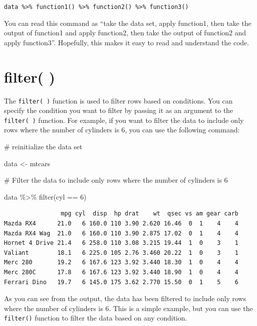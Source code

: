 \documentclass[
  letterpaper,
  DIV=11,
  numbers=noendperiod]{scrreprt}
\newenvironment{Shaded}{\begin{snugshade}}{\end{snugshade}}
\newcommand{\CommentTok}[1]{\textcolor[rgb]{0.37,0.37,0.37}{#1}}
\newcommand{\DecValTok}[1]{\textcolor[rgb]{0.68,0.00,0.00}{#1}}
\newcommand{\FunctionTok}[1]{\textcolor[rgb]{0.28,0.35,0.67}{#1}}
\newcommand{\NormalTok}[1]{\textcolor[rgb]{0.00,0.23,0.31}{#1}}
\newcommand{\OtherTok}[1]{\textcolor[rgb]{0.00,0.23,0.31}{#1}}
\newcommand{\SpecialCharTok}[1]{\textcolor[rgb]{0.37,0.37,0.37}{#1}}
\begin{document}
\texttt{data\ \%\textgreater{}\%\ function1()\ \%\textgreater{}\%\ function2()\ \%\textgreater{}\%\ function3()}

You can read this command as ``take the data set, apply function1, then
take the output of function1 and apply function2, then take the output
of function2 and apply function3''. Hopefully, this makes it easy to
read and understand the code.

\section*{filter( )}\label{filter}


The \texttt{filter(\ )} function is used to filter rows based on
conditions. You can specify the condition you want to filter by passing
it as an argument to the \texttt{filter(\ )} function. For example, if
you want to filter the data to include only rows where the number of
cylinders is 6, you can use the following command:

\begin{Shaded}
\begin{Highlighting}[]
\CommentTok{\# reinitialize the data set}

\NormalTok{data }\OtherTok{\textless{}{-}}\NormalTok{ mtcars}

\CommentTok{\# Filter the data to include only rows where the number of cylinders is 6}

\NormalTok{data }\SpecialCharTok{\%\textgreater{}\%}
  \FunctionTok{filter}\NormalTok{(cyl }\SpecialCharTok{==} \DecValTok{6}\NormalTok{)}
\end{Highlighting}
\end{Shaded}

\begin{verbatim}
                mpg cyl  disp  hp drat    wt  qsec vs am gear carb
Mazda RX4      21.0   6 160.0 110 3.90 2.620 16.46  0  1    4    4
Mazda RX4 Wag  21.0   6 160.0 110 3.90 2.875 17.02  0  1    4    4
Hornet 4 Drive 21.4   6 258.0 110 3.08 3.215 19.44  1  0    3    1
Valiant        18.1   6 225.0 105 2.76 3.460 20.22  1  0    3    1
Merc 280       19.2   6 167.6 123 3.92 3.440 18.30  1  0    4    4
Merc 280C      17.8   6 167.6 123 3.92 3.440 18.90  1  0    4    4
Ferrari Dino   19.7   6 145.0 175 3.62 2.770 15.50  0  1    5    6
\end{verbatim}

As you can see from the output, the data has been filtered to include
only rows where the number of cylinders is 6. This is a simple example,
but you can use the \texttt{filter()} function to filter the data based
on any condition.
\end{document}
